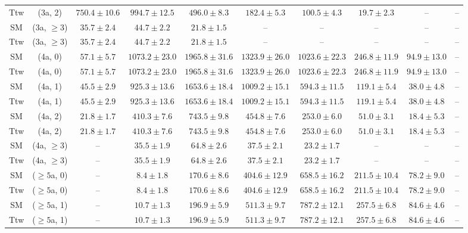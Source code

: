 \begin{table}[h!]
{\begin{tabular}{cccccccccc}
	Ttw & (3a, 2) & $750.4\pm 10.6$ & $994.7\pm 12.5$ & $496.0\pm 8.3$ & $182.4\pm 5.3$ & $100.5\pm 4.3$ & $19.7\pm 2.3$ & -- & -- \\[0.5ex] 
	SM & (3a, $\ge3$) & $35.7\pm 2.4$ & $44.7\pm 2.2$ & $21.8\pm 1.5$ & -- & -- & -- & -- & -- \\[0.5ex] 
	Ttw & (3a, $\ge3$) & $35.7\pm 2.4$ & $44.7\pm 2.2$ & $21.8\pm 1.5$ & -- & -- & -- & -- & -- \\[0.5ex] 
	SM & (4a, 0) & $57.1\pm 5.7$ & $1073.2\pm 23.0$ & $1965.8\pm 31.6$ & $1323.9\pm 26.0$ & $1023.6\pm 22.3$ & $246.8\pm 11.9$ & $94.9\pm 13.0$ & -- \\[0.5ex] 
	Ttw & (4a, 0) & $57.1\pm 5.7$ & $1073.2\pm 23.0$ & $1965.8\pm 31.6$ & $1323.9\pm 26.0$ & $1023.6\pm 22.3$ & $246.8\pm 11.9$ & $94.9\pm 13.0$ & -- \\[0.5ex] 
	SM & (4a, 1) & $45.5\pm 2.9$ & $925.3\pm 13.6$ & $1653.6\pm 18.4$ & $1009.2\pm 15.1$ & $594.3\pm 11.5$ & $119.1\pm 5.4$ & $38.0\pm 4.8$ & -- \\[0.5ex] 
	Ttw & (4a, 1) & $45.5\pm 2.9$ & $925.3\pm 13.6$ & $1653.6\pm 18.4$ & $1009.2\pm 15.1$ & $594.3\pm 11.5$ & $119.1\pm 5.4$ & $38.0\pm 4.8$ & -- \\[0.5ex] 
	SM & (4a, 2) & $21.8\pm 1.7$ & $410.3\pm 7.6$ & $743.5\pm 9.8$ & $454.8\pm 7.6$ & $253.0\pm 6.0$ & $51.0\pm 3.1$ & $18.4\pm 5.3$ & -- \\[0.5ex] 
	Ttw & (4a, 2) & $21.8\pm 1.7$ & $410.3\pm 7.6$ & $743.5\pm 9.8$ & $454.8\pm 7.6$ & $253.0\pm 6.0$ & $51.0\pm 3.1$ & $18.4\pm 5.3$ & -- \\[0.5ex] 
	SM & (4a, $\ge3$) & -- & $35.5\pm 1.9$ & $64.8\pm 2.6$ & $37.5\pm 2.1$ & $23.2\pm 1.7$ & -- & -- & -- \\[0.5ex] 
	Ttw & (4a, $\ge3$) & -- & $35.5\pm 1.9$ & $64.8\pm 2.6$ & $37.5\pm 2.1$ & $23.2\pm 1.7$ & -- & -- & -- \\[0.5ex] 
	SM & ($\ge5$a, 0) & -- & $8.4\pm 1.8$ & $170.6\pm 8.6$ & $404.6\pm 12.9$ & $658.5\pm 16.2$ & $211.5\pm 10.4$ & $78.2\pm 9.0$ & -- \\[0.5ex] 
	Ttw & ($\ge5$a, 0) & -- & $8.4\pm 1.8$ & $170.6\pm 8.6$ & $404.6\pm 12.9$ & $658.5\pm 16.2$ & $211.5\pm 10.4$ & $78.2\pm 9.0$ & -- \\[0.5ex] 
	SM & ($\ge5$a, 1) & -- & $10.7\pm 1.3$ & $196.9\pm 5.9$ & $511.3\pm 9.7$ & $787.2\pm 12.1$ & $257.5\pm 6.8$ & $84.6\pm 4.6$ & -- \\[0.5ex] 
	Ttw & ($\ge5$a, 1) & -- & $10.7\pm 1.3$ & $196.9\pm 5.9$ & $511.3\pm 9.7$ & $787.2\pm 12.1$ & $257.5\pm 6.8$ & $84.6\pm 4.6$ & -- \\[0.5ex] 

\end{tabular}}
\end{table}

